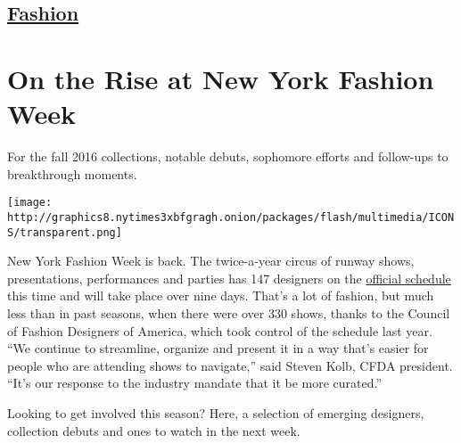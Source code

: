 \hypertarget{-fashion-}{%
\subsection{\texorpdfstring{ \href{/section/fashion}{Fashion}
}{ Fashion }}\label{-fashion-}}

\hypertarget{on-the-rise-at-new-york-fashion-week}{%
\section{On the Rise at New York Fashion
Week}\label{on-the-rise-at-new-york-fashion-week}}

For the fall 2016 collections, notable debuts, sophomore efforts and
follow-ups to breakthrough moments.

\texttt{[image: http://graphics8.nytimes3xbfgragh.onion/packages/flash/multimedia/ICONS/transparent.png]}

New York Fashion Week is back. The twice-a-year circus of runway shows,
presentations, performances and parties has 147 designers on the
\href{http://newyorkfashionweeklive.com/schedule}{official schedule}
this time and will take place over nine days. That's a lot of fashion,
but much less than in past seasons, when there were over 330 shows,
thanks to the Council of Fashion Designers of America, which took
control of the schedule last year. ``We continue to streamline, organize
and present it in a way that's easier for people who are attending shows
to navigate,'' said Steven Kolb, CFDA president. ``It's our response to
the industry mandate that it be more curated.''

Looking to get involved this season? Here, a selection of emerging
designers, collection debuts and ones to watch in the next week.

